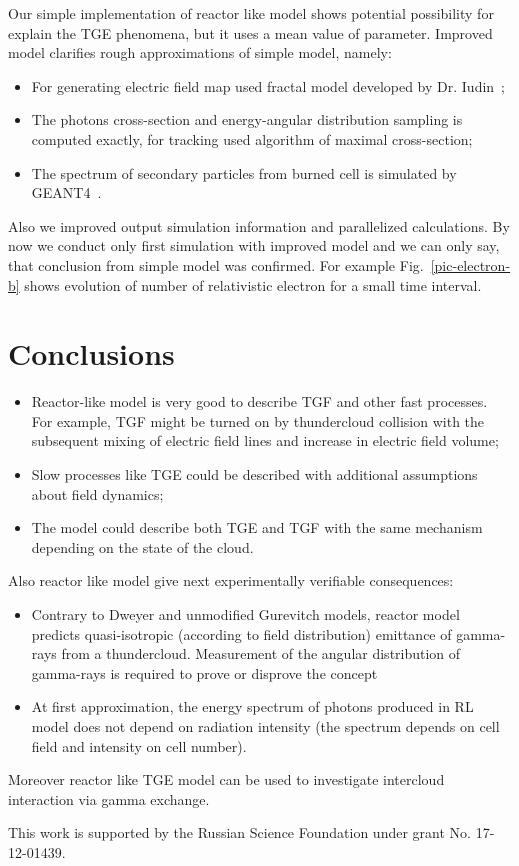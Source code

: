 \documentclass[%
 aip,
cp,  %
 amsmath,amssymb,%
 reprint,%
]{revtex4-2}
\begin{document}
Our simple implementation of reactor like model shows potential possibility for explain the TGE phenomena, but it uses a mean value of parameter. 
Improved model clarifies rough approximations of simple model, namely:
\begin{itemize}
	\item For generating electric field map used fractal model developed by Dr. Iudin~\cite{Iudin:2018};
	\item The photons cross-section and energy-angular distribution sampling  is computed exactly, for tracking used algorithm of maximal cross-section;
	\item The spectrum of secondary particles from burned cell is simulated by GEANT4~\cite{ALLISON2016186}.
\end{itemize}

Also we improved output simulation information and parallelized calculations. By now we conduct only first simulation with improved model and we can only say, that conclusion from simple model  was confirmed. For example Fig.~\ref{pic-electron-b} shows evolution of number of relativistic electron for a small time interval.
\section{Conclusions}
\begin{itemize}
   	\item Reactor-like model is very good to describe TGF and other fast processes. For example, TGF might be turned on by thundercloud collision with the subsequent mixing of electric field lines and increase in electric field volume;
   	\item Slow processes like TGE could be described with additional assumptions about field dynamics;
   	\item The model could describe both TGE and TGF with the same mechanism depending on the state of the cloud.
\end{itemize}

Also reactor like model give next experimentally verifiable consequences:
\begin{itemize}
   	\item Contrary to Dweyer and unmodified Gurevitch models, reactor model predicts quasi-isotropic (according to field distribution) emittance of gamma-rays from a thundercloud. 	Measurement of the angular distribution of gamma-rays is required to prove or disprove the concept
   	\item At first approximation, the energy spectrum of photons produced in RL model does not depend on radiation intensity (the spectrum depends on cell field and intensity on cell number).
\end{itemize}
Moreover reactor like TGE model can be used to investigate intercloud interaction via gamma exchange.
\begin{acknowledgments}
This work is supported by the Russian Science Foundation under grant No. 17-12-01439.
\end{acknowledgments}
\nocite{*}
\end{document}
